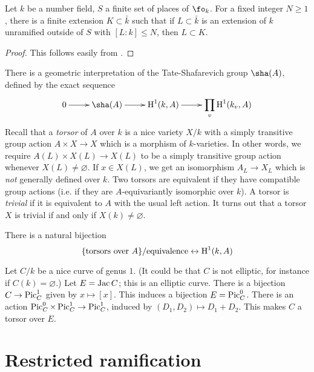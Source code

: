 \documentclass{article}
\begin{document}
\begin{theorem}[Hermite]\label{thm:hermite}
Let $k$ be a number field, $S$ a finite set of places of $\fo_k$. For a fixed 
integer $N\geqslant 1$, there is a finite extension $K\subset \bar k$ such that 
if $L\subset \bar k$ is an extension of $k$ unramified outside of $S$ with 
$[L:k]\leqslant N$, then $L\subset K$. 
\end{theorem}
\begin{proof}
This follows easily from \cite[B.2.14]{bg06}. 
\end{proof}

There is a geometric interpretation of the Tate-Shafarevich group $\sha(A)$, 
defined by the exact sequence 
\[\xymatrix{
  0 \ar[r] 
    & \sha(A) \ar[r] 
    & \h^1(k,A) \ar[r] 
    & \displaystyle\prod_v \h^1(k_v,A)
 }\]
Recall that a \emph{torsor} of $A$ over $k$ is a nice variety $X/k$ with a 
simply transitive group action $A\times X\to X$ which is a morphism of 
$k$-varieties. In other words, we require $A(L)\times X(L)\to X(L)$ to be 
a simply transitive group action whenever $X(L)\ne\varnothing$. If 
$x\in X(L)$, we get an isomorphism $A_L\to X_L$ which is \emph{not} generally 
defined over $k$. Two torsors are equivalent if they have compatible group 
actions (i.e. if they are $A$-equivariantly isomorphic over $k$). A torsor is 
\emph{trivial} if it is equivalent to $A$ with the usual left action. It turns 
out that a torsor $X$ is trivial if and only if $X(k)\ne\varnothing$. 

There is a natural bijection 
\[
  \{\text{torsors over $A$}\}/\text{equivalence} \leftrightarrow \operatorname{H}^1(k,A)
\]

\begin{example}
Let $C/k$ be a nice curve of genus $1$. (It could be that $C$ is not elliptic, 
for instance if $C(k)=\varnothing$.) Let $E=\operatorname{Jac} C$; this is an elliptic curve. 
There is a bijection $C\to \operatorname{Pic}_C^1$ given by $x\mapsto [x]$. This induces a 
bijection $E=\operatorname{Pic}_C^0$. There is an action 
$\operatorname{Pic}_C^0\times \operatorname{Pic}_C^1\to \operatorname{Pic}_C^1$, induced by $(D_1,D_2)\mapsto D_1+D_2$. 
This makes $C$ a torsor over $E$. 
\end{example}





\section{Restricted ramification}
\end{document}
